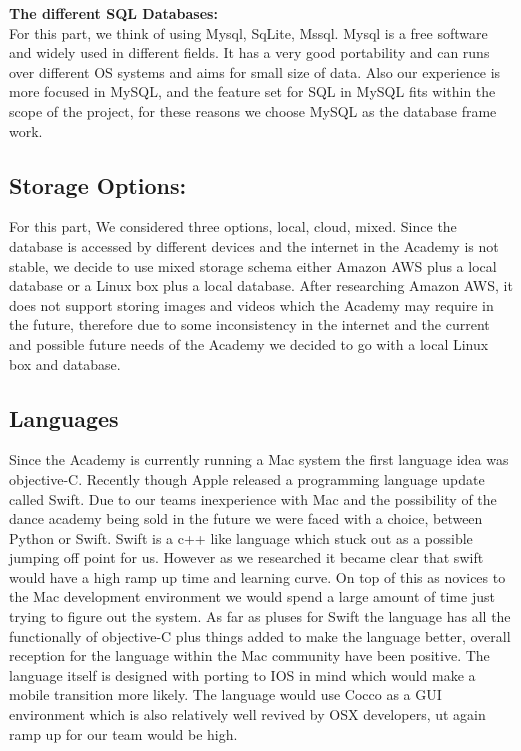 \documentclass[11pt]{book}
\begin{document}
\textbf{The different SQL Databases:}\\
For this part, we think of using Mysql, SqLite, Mssql. Mysql is a free software and widely used in different fields. It has a very good portability and can runs over different OS systems and aims for small size of data. Also our experience is more focused in MySQL, and the feature set for SQL in MySQL fits within the scope of the project, for these reasons we choose MySQL as the database frame work.

\subsection{Storage Options:}
For this part, We considered three options, local, cloud, mixed. Since the database is accessed by different devices and the internet in the Academy is not stable, we decide to use mixed storage schema either Amazon AWS plus a local database or a Linux box plus a local database. After researching Amazon AWS, it does not support storing images and videos which the Academy may require in the future, therefore   due to some inconsistency in the internet and the current and possible future needs of the Academy we decided to go with a local Linux box and database.\\

\subsection{Languages}
Since the Academy is currently running a Mac system the first language idea was objective-C. Recently though Apple released a programming language update called Swift. Due to our teams inexperience with Mac and the possibility of the dance academy being sold in the future we were faced with a choice, between Python or Swift. Swift is a c++ like language which stuck out as a possible jumping off point for us. However as we researched it became clear that swift would have a high ramp up time and learning curve. On top of this as novices to the Mac development environment we would spend a large amount of time just trying to figure out the system. As far as pluses for Swift the language has all the functionally of objective-C plus things added to make the language better, overall reception for the language within the Mac community have been positive. The language itself is designed with porting to IOS in mind which would make a mobile transition more likely. The language would use Cocco as a GUI environment which is also relatively well revived by OSX developers, ut again ramp up for our team would be high.
\end{document}

